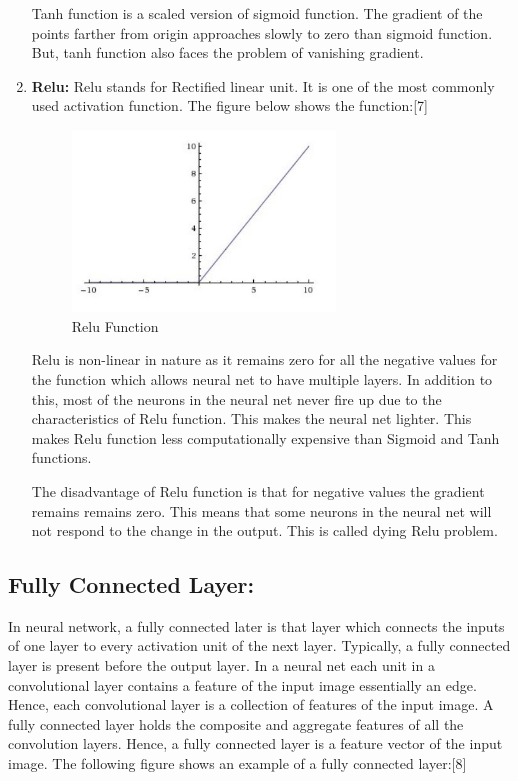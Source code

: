 \documentclass{IEEEtran}
\begin{document}
\begin{enumerate}
Tanh function is a scaled version of sigmoid function. The gradient of the points farther from origin approaches slowly to zero than sigmoid function. But, tanh function also faces the problem of vanishing gradient.

\item \textbf{Relu:} Relu stands for Rectified linear unit. It is one of the most commonly used activation function. The figure below shows the function:[7]
\begin{figure}[h]
    \centering
    \captionsetup{justification=centering}
    \includegraphics[width=7cm]{relu}
    \caption{Relu Function}
    \label{fig: Relu Function}
\end{figure}

Relu is non-linear in nature as it remains zero for all the negative values for the function which allows neural net to have multiple layers. In addition to this, most of the neurons in the neural net never fire up due to the characteristics of Relu function. This makes the neural net lighter. This makes Relu function less computationally expensive than Sigmoid and Tanh functions.

The disadvantage of Relu function is that for negative values the gradient remains remains zero. This means that some neurons in the neural net will not respond to the change in the output. This is called dying Relu problem.
\end{enumerate} 

\subsection{\textbf{Fully Connected Layer:}}
In neural network, a fully connected later is that layer which connects the inputs of one layer to every activation unit of the next layer. Typically, a fully connected layer is present before the output layer. In a neural net each unit in a convolutional layer contains a feature of the input image essentially an edge. Hence, each convolutional layer is a collection of features of the input image. A fully connected layer holds the composite and aggregate features of all the convolution layers. Hence, a fully connected layer is a feature vector of the input image. The following figure shows an example of a fully connected layer:[8]
\end{document}

